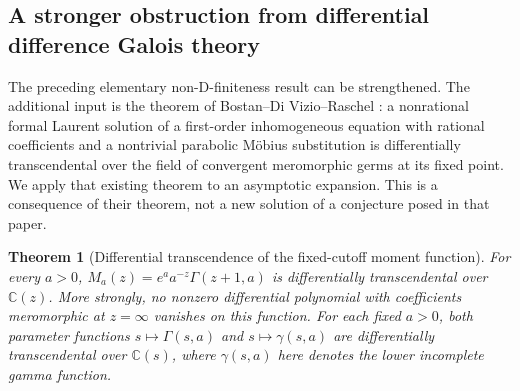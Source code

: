 \documentclass[11pt,a4paper]{article}
\newtheorem{theorem}{Theorem}[section]
\theoremstyle{definition}
\theoremstyle{remark}
\numberwithin{equation}{section}
\begin{document}
\subsection{A stronger obstruction from differential difference Galois theory}

The preceding elementary non-D-finiteness result can be strengthened.
The additional input is the theorem of Bostan--Di Vizio--Raschel
\cite[Theorem~3 and Corollary~40]{p3:BDR2024}: a nonrational formal
Laurent solution of a first-order inhomogeneous equation with rational
coefficients and a nontrivial parabolic M\"obius substitution is
differentially transcendental over the field of convergent meromorphic
germs at its fixed point. We apply that existing theorem to an
asymptotic expansion. This is a consequence of their theorem, not a
new solution of a conjecture posed in that paper.

\begin{theorem}[Differential transcendence of the fixed-cutoff moment function]
\label{p3:thm:gompertz-dtrans}
For every $a>0$, $M_a(z)=e^aa^{-z}\Gamma(z+1,a)$ is
differentially transcendental over $\mathbb C(z)$. More strongly, no
nonzero differential polynomial with coefficients meromorphic at
$z=\infty$ vanishes on this function. For each fixed $a>0$, both
parameter functions $s\mapsto\Gamma(s,a)$ and
$s\mapsto\gamma(s,a)$ are differentially transcendental over
$\mathbb C(s)$, where $\gamma(s,a)$ here denotes the lower incomplete
gamma function.
\end{theorem}
\end{document}
